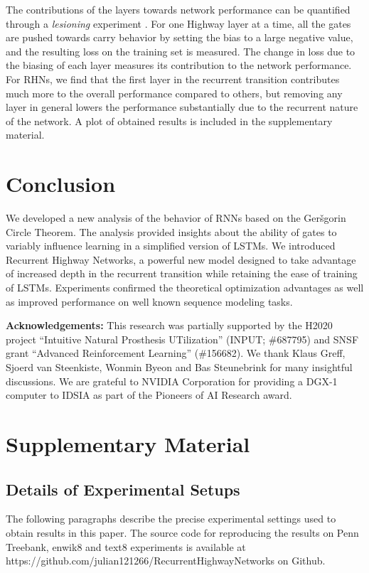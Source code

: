 \documentclass[letterpaper]{article}
\def\gers{Ger\v{s}gorin}
\def\Arch{Recurrent Highway Network} \def\arch{RHN}
\begin{document}
The contributions of the layers towards network performance can be quantified through a \emph{lesioning} experiment \citep{highways}.
For one Highway layer at a time, all the gates are pushed towards carry behavior by setting the bias to a large negative value, and the resulting loss on the training set is measured.
The change in loss due to the biasing of each layer measures its contribution to the network performance.
For RHNs, we find that the first layer in the recurrent transition contributes much more to the overall performance compared to others,
but removing any layer in general lowers the performance substantially due to the recurrent nature of the network.
A plot of obtained results is included in the supplementary material.

\section{Conclusion}\label{sec:discussion}
We developed a new analysis of the behavior of RNNs based on the \gers{} Circle Theorem.
The analysis provided insights about the ability of gates to variably influence learning in a simplified version of LSTMs.
We introduced \Arch{}s, a powerful new model designed to take advantage of increased depth in the recurrent transition while retaining the ease of training of LSTMs.
Experiments confirmed the theoretical optimization advantages as well as improved performance on well known sequence modeling tasks.

\textbf{Acknowledgements:}
This research was partially supported by the H2020 project ``Intuitive Natural Prosthesis UTilization'' (INPUT; \#687795) and SNSF grant ``Advanced Reinforcement Learning'' (\#156682). 
We thank Klaus Greff, Sjoerd van Steenkiste, Wonmin Byeon and Bas Steunebrink for many insightful discussions.
We are grateful to NVIDIA Corporation for providing a DGX-1 computer to IDSIA as part of the Pioneers of AI Research award.
\small


\clearpage
\section{Supplementary Material}
\subsection{Details of Experimental Setups}

The following paragraphs describe the precise experimental settings used to obtain results in this paper. 
The source code for reproducing the results on Penn Treebank, enwik8 and text8 experiments is available at https://github.com/julian121266/RecurrentHighwayNetworks on Github.
\end{document}
